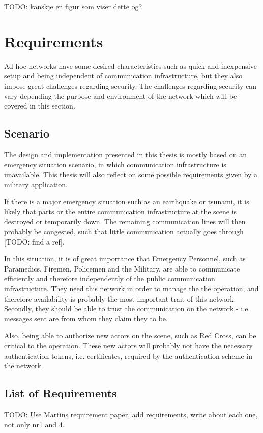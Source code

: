 TODO: kanskje en figur som viser dette og?

\section{Requirements}
Ad hoc networks have some desired characteristics such as quick and inexpensive
setup and being independent of communication infrastructure, but they also
impose great challenges regarding security. The challenges regarding security
can vary depending the purpose and environment of the network which will be
covered in this section.

\subsection{Scenario}
The design and implementation presented in this thesis is mostly based on an
emergency situation scenario, in which communication infrastructure is
unavailable. This thesis will also reflect on some possible requirements given
by a military application.

If there is a major emergency situation such as an earthquake or tsunami, it is
likely that parts or the entire communication infrastructure at the scene
is destroyed or temporarily down. The remaining communication lines will then
probably be congested, such that little communication actually goes through
[TODO: find a ref].

In this situation, it is of great importance that Emergency Personnel, such as
Paramedics, Firemen, Policemen and the Military, are able to communicate
efficiently and therefore independently of the public communication
infrastructure. They need this network in order to manage the the operation, and
therefore availability is probably the most important trait of this network.
Secondly, they should be able to trust the communication on the network - i.e.
messages sent are from whom they claim they to be.

Also, being able to authorize new actors on the scene, such as Red Cross, can be
critical to the operation. These new actors will probably not have the necessary
authentication tokens, i.e. certificates, required by the authentication scheme
in the network.

\subsection{List of Requirements}
TODO: Use Martins requirement paper, add requirements, write about each one, not
only nr1 and 4.

